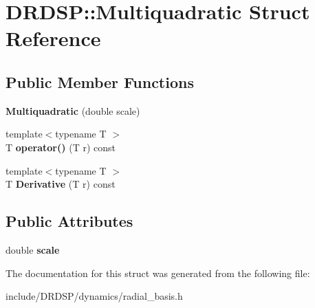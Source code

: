 \hypertarget{struct_d_r_d_s_p_1_1_multiquadratic}{\section{D\-R\-D\-S\-P\-:\-:Multiquadratic Struct Reference}
\label{struct_d_r_d_s_p_1_1_multiquadratic}
}
\subsection*{Public Member Functions}
\begin{DoxyCompactItemize}
\item 
\hypertarget{struct_d_r_d_s_p_1_1_multiquadratic_a9676531016bae341f6c2e9163041b899}{{\bfseries Multiquadratic} (double scale)}\label{struct_d_r_d_s_p_1_1_multiquadratic_a9676531016bae341f6c2e9163041b899}

\item 
\hypertarget{struct_d_r_d_s_p_1_1_multiquadratic_aca54d746ab7b550198d005901bff0470}{{\footnotesize template$<$typename T $>$ }\\T {\bfseries operator()} (T r) const }\label{struct_d_r_d_s_p_1_1_multiquadratic_aca54d746ab7b550198d005901bff0470}

\item 
\hypertarget{struct_d_r_d_s_p_1_1_multiquadratic_a74604d43e27612cd26b42b7e825ca161}{{\footnotesize template$<$typename T $>$ }\\T {\bfseries Derivative} (T r) const }\label{struct_d_r_d_s_p_1_1_multiquadratic_a74604d43e27612cd26b42b7e825ca161}

\end{DoxyCompactItemize}
\subsection*{Public Attributes}
\begin{DoxyCompactItemize}
\item 
\hypertarget{struct_d_r_d_s_p_1_1_multiquadratic_ad075ed2b3b85cab9d74369163eab65cf}{double {\bfseries scale}}\label{struct_d_r_d_s_p_1_1_multiquadratic_ad075ed2b3b85cab9d74369163eab65cf}

\end{DoxyCompactItemize}


The documentation for this struct was generated from the following file\-:\begin{DoxyCompactItemize}
\item 
include/\-D\-R\-D\-S\-P/dynamics/radial\-\_\-basis.\-h\end{DoxyCompactItemize}
